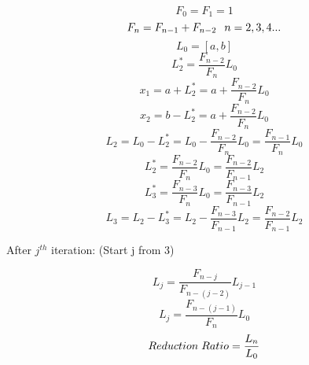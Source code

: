 \documentclass[12pt, letterpaper]{article}
\begin{document}
\begin{equation}F_0 = F_1 = 1\end{equation}
\begin{equation}F_n = F_{n-1} + F_{n-2} \hspace{0.25cm} n=2,3,4...\end{equation}
\begin{equation}L_0 = [a, b] \end{equation}
\begin{equation}L_2^{*} = \frac{F_{n-2}}{F_{n}}L_0\end{equation}
\begin{equation}x_1 = a + L_2^{*} = a + \frac{F_{n-2}}{F_n}L_0 \end{equation}
\begin{equation}x_2 = b - L_2^* = a + \frac{F_{n-2}}{F_n}L_0 \end{equation}
\begin{equation}L_2 = L_0 - L_2^* = L_0 - \frac{F_{n-2}}{F_n}L_0 = \frac{F_{n-1}}{F_n}L_0\end{equation}
\begin{equation}L_2^* = \frac{F_{n-2}}{F_n}L_0 = \frac{F_{n-2}}{F_{n-1}}L_2\end{equation}
\begin{equation}L_3^*  = \frac{F_{n-3}}{F_n}L_0 = \frac{F_{n-3}}{F_{n-1}}L_2\end{equation}
\begin{equation}
L_3 = L_2 - L_3^* = L_2 - \frac{F_{n-3}}{F_{n-1}}L_2 = \frac{F_{n-2}}{F_{n-1}}L_2    
\end{equation}

After $j^{th}$ iteration:
(Start j from 3)

\begin{equation}L_j = \frac{F_{n-j}}{F_{n-(j-2)}}L_{j-1}\end{equation}
\begin{equation}L_j = \frac{F_{n-(j-1)}}{F_n}L_0\end{equation}
$$ Reduction \hspace{0.1cm} Ratio  =\frac{L_n}{L_0}$$
\end{document}
